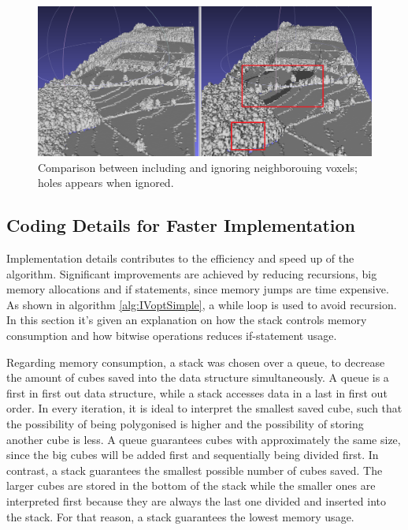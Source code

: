 \documentclass{subfiles}
\begin{document}
\begin{figure}[!htbp]
	\centering
	\includegraphics[width=5.5in]{img/HolesNeighbours}
	\caption{Comparison between including and ignoring neighborouing voxels; holes appears when ignored.}
	\label{fig:IVholesNeighbours}
\end{figure}

\subsection{Coding Details for Faster Implementation}\label{sec:IVcodeDetails}
Implementation details contributes to the efficiency and speed up of the algorithm. Significant improvements are achieved by reducing recursions, big memory allocations and if statements, since memory jumps are time expensive. As shown in algorithm \ref{alg:IVoptSimple}, a while loop is used to avoid recursion. In this section it's given an explanation on how the stack controls memory consumption and how bitwise operations reduces if-statement usage. 

Regarding memory consumption, a stack was chosen over a queue, to decrease the amount of cubes saved into the data structure simultaneously. A queue is a first in first out data structure, while a stack accesses data in a last in first out order. In every iteration, it is ideal to interpret the smallest saved cube, such that the possibility of being polygonised is higher and the possibility of storing another cube is less. A queue guarantees cubes with approximately the same size, since the big cubes will be added first and sequentially being divided first. In contrast, a stack guarantees the smallest possible number of cubes saved. The larger cubes are stored in the bottom of the stack while the smaller ones are interpreted first because they are always the last one divided and inserted into the stack.  For that reason, a stack guarantees the lowest memory usage. 
\end{document}
